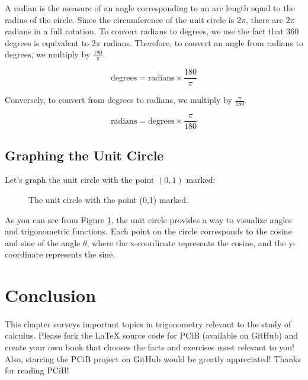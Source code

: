\documentclass[a4paper,12pt]{book}
\begin{document}
A radian is the measure of an angle corresponding to an arc length equal to the radius of the circle. Since the circumference of the unit circle is \(2\pi\), there are \(2\pi\) radians in a full rotation. To convert radians to degrees, we use the fact that \(360\) degrees is equivalent to \(2\pi\) radians. Therefore, to convert an angle from radians to degrees, we multiply by \(\frac{180}{\pi}\).

\[
\text{degrees} = \text{radians} \times \frac{180}{\pi}
\]

Conversely, to convert from degrees to radians, we multiply by \(\frac{\pi}{180}\).

\[
\text{radians} = \text{degrees} \times \frac{\pi}{180}
\]

\subsection{Graphing the Unit Circle}
\label{subsec:graphing_unit_circle}

Let's graph the unit circle with the point \((0,1)\) marked:

\begin{figure}[ht!]
\centering
{}
\caption{The unit circle with the point (0,1) marked.}
\label{fig:unit_circle}
\end{figure}

As you can see from Figure \ref{fig:unit_circle}, the unit circle provides a way to visualize angles and trigonometric functions. Each point on the circle corresponds to the cosine and sine of the angle \(\theta\), where the x-coordinate represents the cosine, and the y-coordinate represents the sine.



\section*{Conclusion}
\paragraph{}
This chapter surveys important topics in trigonometry relevant to the study of calculus. Please fork the LaTeX source code for PCiB (available on GitHub) and create your own book that chooses the facts and exercises most relevant to you! Also, starring the PCiB project on GitHub would be greatly appreciated! Thanks for reading PCiB!
\end{document}
